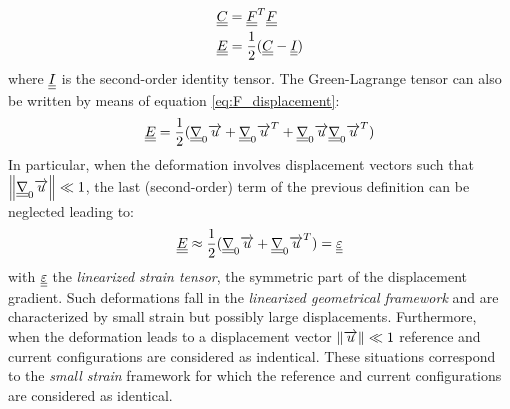 \begin{equation*}
  \begin{aligned}
    & {\underline{\underline{C}}}={\underline{\underline{F}}}^T{\underline{\underline{F}}} \\
    & {\underline{\underline{E}}}=\frac{1}{2}({\underline{\underline{C}}}-{\underline{\underline{I}}})
  \end{aligned}
\end{equation*}
where ${\underline{\underline{I}}}$ is the second-order identity tensor. The Green-Lagrange tensor can also be written by means of equation \eqref{eq:F_displacement}:
\begin{equation*}
  {\underline{\underline{E}}}=\frac{1}{2}({\underline{\underline{\nabla}}}_0 {\overrightarrow{u}} + {\underline{\underline{\nabla}}}_0 {\overrightarrow{u}}^T + {\underline{\underline{\nabla}}}_0 {\overrightarrow{u}}{\underline{\underline{\nabla}}}_0 {\overrightarrow{u}}^T)
\end{equation*}
In particular, when the deformation involves displacement vectors such that $\left\Vert{\underline{\underline{\nabla}}}_0 {\overrightarrow{u}}\right\Vert \ll 1$, the last (second-order) term of the previous definition can be neglected leading to:
\begin{equation*}
  {\underline{\underline{E}}} \approx \frac{1}{2}({\underline{\underline{\nabla}}}_0 {\overrightarrow{u}} + {\underline{\underline{\nabla}}}_0 {\overrightarrow{u}}^T) = {\underline{\underline{\varepsilon}}}
\end{equation*}
with ${\underline{\underline{\varepsilon}}}$ the \textit{linearized strain tensor}, the symmetric part of the displacement gradient. Such deformations fall in the \textit{linearized geometrical framework} and are characterized by small strain but possibly large displacements. Furthermore, when the deformation leads to a displacement vector $\left\Vert{\overrightarrow{u}}\right\Vert \ll 1$ reference and current configurations are considered as indentical. These situations correspond to the \textit{small strain} framework for which the reference and current configurations are considered as identical.

